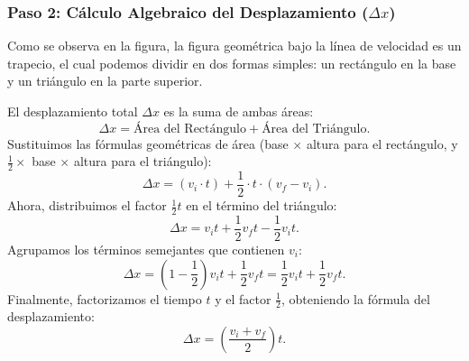\documentclass[11pt,a4paper]{book}
\begin{document}
\subsubsection{Paso 2: Cálculo Algebraico del Desplazamiento ($\Delta x$)}

Como se observa en la figura, la figura geométrica bajo la línea de velocidad es un trapecio, el cual podemos dividir en dos formas simples: un rectángulo en la base y un triángulo en la parte superior.

El desplazamiento total $\Delta x$ es la suma de ambas áreas:
\begin{equation}
    \Delta x = \text{Área del Rectángulo} + \text{Área del Triángulo}.
\end{equation}
Sustituimos las fórmulas geométricas de área (base $\times$ altura para el rectángulo, y $\frac{1}{2} \times$ base $\times$ altura para el triángulo):
\begin{equation}
    \Delta x = (v_i \cdot t) + \frac{1}{2} \cdot t \cdot (v_f - v_i).
\end{equation}
Ahora, distribuimos el factor $\frac{1}{2}t$ en el término del triángulo:
\begin{equation}
    \Delta x = v_i t + \frac{1}{2} v_f t - \frac{1}{2} v_i t.
\end{equation}
Agrupamos los términos semejantes que contienen $v_i$:
\begin{equation}
    \Delta x = \left( 1 - \frac{1}{2} \right) v_i t + \frac{1}{2} v_f t = \frac{1}{2} v_i t + \frac{1}{2} v_f t.
\end{equation}
Finalmente, factorizamos el tiempo $t$ y el factor $\frac{1}{2}$, obteniendo la fórmula del desplazamiento:
\begin{equation}
    \Delta x = \left( \frac{v_i + v_f}{2} \right) t.
    \label{eq:desplazamiento_trapecio}
\end{equation}


\end{document}
